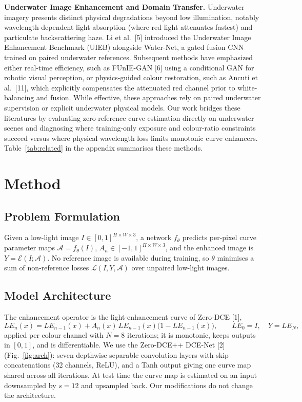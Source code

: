 \documentclass[11pt, letterpaper]{article}
\begin{document}
\textbf{Underwater Image Enhancement and Domain Transfer.} Underwater imagery
presents distinct physical degradations beyond low illumination, notably
wavelength-dependent light absorption (where red light attenuates fastest) and
particulate backscattering haze. Li et al.\ [5] introduced the Underwater Image
Enhancement Benchmark (UIEB) alongside Water-Net, a gated fusion CNN trained on
paired underwater references. Subsequent methods have emphasized either real-time
efficiency, such as FUnIE-GAN [6] using a conditional GAN for robotic visual
perception, or physics-guided colour restoration, such as Ancuti et al.\ [11], which
explicitly compensates the attenuated red channel prior to white-balancing and
fusion. While effective, these approaches rely on paired underwater supervision or
explicit underwater physical models. Our work bridges these literatures by
evaluating zero-reference curve estimation directly on underwater scenes and
diagnosing where training-only exposure and colour-ratio constraints succeed versus
where physical wavelength loss limits monotonic curve enhancers.
Table~\ref{tab:related} in the appendix summarises these methods.

\section{Method}

\subsection{Problem Formulation}

Given a low-light image $I \in [0,1]^{H \times W \times 3}$, a network
$f_\theta$ predicts per-pixel curve parameter maps $\mathcal{A} = f_\theta(I)$,
$A_n \in [-1,1]^{H \times W \times 3}$, and the enhanced image is
$Y = \mathcal{E}(I; \mathcal{A})$. No reference image is available during
training, so $\theta$ minimises a sum of non-reference losses
$\mathcal{L}(I, Y, \mathcal{A})$ over unpaired low-light images.

\subsection{Model Architecture}

The enhancement operator is the light-enhancement curve of Zero-DCE [1],
\begin{equation}
  LE_n(x) = LE_{n-1}(x) + A_n(x)\, LE_{n-1}(x)\bigl(1 - LE_{n-1}(x)\bigr),
  \qquad LE_0 = I, \quad Y = LE_N,
  \label{eq:curve}
\end{equation}
applied per colour channel with $N = 8$ iterations; it is monotonic, keeps outputs
in $[0,1]$, and is differentiable. We use the Zero-DCE++ DCE-Net [2]
(Fig.~\ref{fig:arch}): seven depthwise separable convolution layers with skip
concatenations (32 channels, ReLU), and a Tanh output giving one curve map shared
across all iterations. At test time the curve map is estimated on an input
downsampled by $s = 12$ and upsampled back. Our modifications do not change the
architecture.
\end{document}
